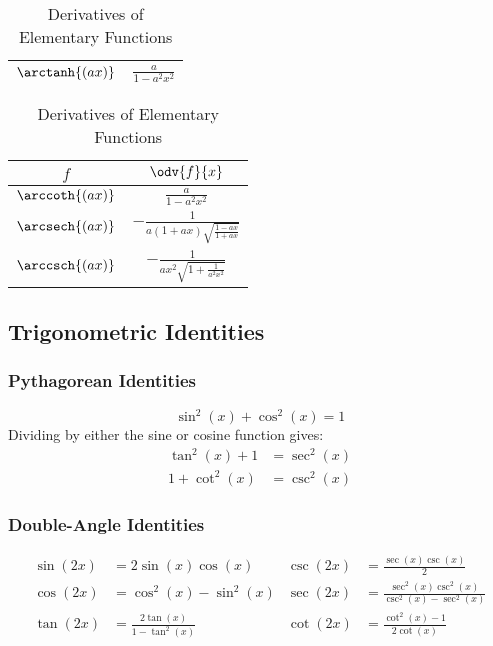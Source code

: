 \documentclass{article}
\begin{document}
\begin{appendix}
\begin{table}[H]
\begin{tabular}{c c}
            \(\arctanh{\left( ax \right)}\) & \(\displaystyle \frac{a}{1-a^2x^2}\)        \\[8pt]
            \bottomrule
        \end{tabular}
        \begin{tabular}{c c}
            \toprule
            \(f\)                           & \(\odv{f}{x}\)                                                            \\
            \midrule
            \(\arccoth{\left( ax \right)}\) & \(\displaystyle  \frac{a}{1-a^2x^2}\)                                     \\[8pt]
            \(\arcsech{\left( ax \right)}\) & \(\displaystyle -\frac{1}{a\left( 1+ax \right)\sqrt{\frac{1-ax}{1+ax}}}\) \\[8pt]
            \(\arccsch{\left( ax \right)}\) & \(\displaystyle -\frac{1}{ax^2\sqrt{1+\frac{1}{a^2x^2}}}\)                \\[8pt]
            \bottomrule
        \end{tabular}
        \hspace*{-1cm}
        \caption{Derivatives of Elementary Functions}
    \end{table}
    \subsection{Trigonometric Identities}
    \subsubsection{Pythagorean Identities}
    \begin{equation*}
        \sin^2{\left( x \right)} + \cos^2{\left( x \right)} = 1
    \end{equation*}
    Dividing by either the sine or cosine function gives:
    \begin{align*}
        \tan^2{\left( x \right)} + 1 & = \sec^2{\left( x \right)} \\
        1 + \cot^2{\left( x \right)} & = \csc^2{\left( x \right)}
    \end{align*}
    \subsubsection{Double-Angle Identities}
    \begin{align*}
        \sin{\left( 2x \right)} & = 2\sin{\left( x \right)}\cos{\left( x \right)}              & \csc{\left( 2x \right)} & = \frac{\sec{\left( x \right)}\csc{\left( x \right)}}{2}                                                     \\[5pt]
        \cos{\left( 2x \right)} & = \cos^2{\left( x \right)} - \sin^2{\left( x \right)}        & \sec{\left( 2x \right)} & = \frac{\sec^2{\left( x \right)}\csc^2{\left( x \right)}}{\csc^2{\left( x \right)}-\sec^2{\left( x \right)}} \\[5pt]
        \tan{\left( 2x \right)} & = \frac{2\tan{\left( x \right)}}{1-\tan^2{\left( x \right)}} & \cot{\left( 2x \right)} & = \frac{\cot^2{\left( x \right)}-1}{2\cot{\left( x \right)}}
    \end{align*}

\end{appendix}
\end{document}
